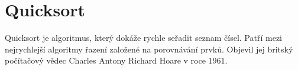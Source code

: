 \section{Quicksort}
\label{sec:quicksort}

Quicksort je algoritmus, který dokáže rychle seřadit seznam čísel. Patří mezi nejrychlejší algoritmy řazení založené na porovnávání prvků. Objevil jej britský počítačový vědec Charles Antony Richard Hoare v roce 1961.

\begin{center}
\end{center}
